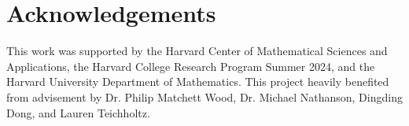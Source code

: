 \documentclass[11pt]{article}
\theoremstyle{definition}
\begin{document}
\section{Acknowledgements}
This work was supported by the Harvard Center of Mathematical Sciences and Applications, the Harvard College Research Program Summer 2024, and the Harvard University Department of Mathematics. This project heavily benefited from advisement by Dr. Philip Matchett Wood, Dr. Michael Nathanson, Dingding Dong, and Lauren Teichholtz.



\end{document}
